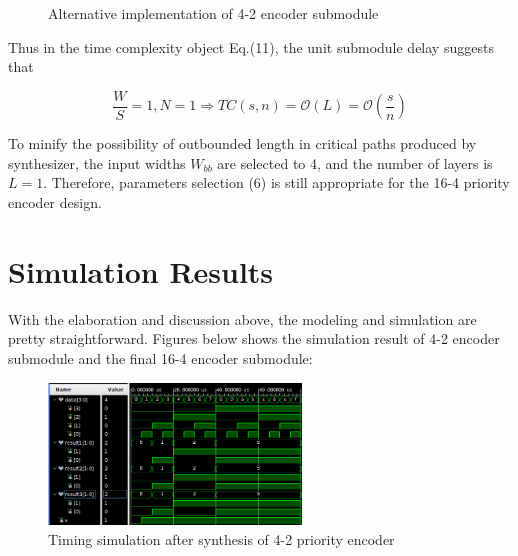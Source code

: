 \documentclass[journal, onecolumn]{IEEEtran}
\begin{document}
\begin{figure}[htpb]
  \begin{center}
    \hspace{0.05\textwidth}
    \caption{Alternative implementation of 4-2 encoder submodule}
    \label{42enc_alternative}
  \end{center}
\end{figure}

Thus in the time complexity object Eq.(11), the unit submodule delay suggests that

\begin{equation}
  \frac{W}{S}=1, N=1 \Rightarrow TC(s,n)=\mathcal{O}(L)=\mathcal{O}(\frac{s}{n})
\end{equation}

To minify the possibility of outbounded length in critical paths produced by synthesizer, the input widths \(W_{bb}\) are selected to 4, and the number of layers is \(L=1\). Therefore, parameters selection (6) is still appropriate for the 16-4 priority encoder design.

\section{Simulation Results}

With the elaboration and discussion above, the modeling and simulation are pretty straightforward. Figures below shows the simulation result of 4-2 encoder submodule and the final 16-4 encoder submodule:

\begin{figure}[htpb]
  \begin{center}
    \includegraphics[width=0.6\textwidth]{report_lab3.assets/20240324194920.png}
    \caption{Timing simulation after synthesis of 4-2 priority encoder}
    \label{timing_sim_aftersynth_42}
  \end{center}
\end{figure}
\end{document}

